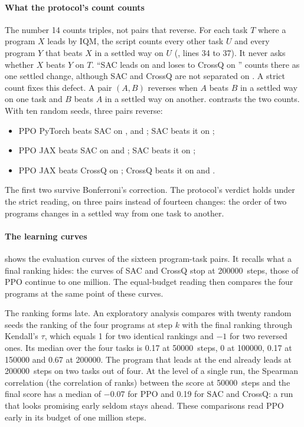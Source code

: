 \paragraph{What the protocol's count counts}
The number 14 counts triples, not pairs that reverse. For each task $T$ where a program $X$ leads by IQM,
the script counts every other task $U$ and every program $Y$ that beats $X$ in a settled way on $U$
(, lines 34 to 37). It never asks whether $X$ beats $Y$ on $T$. \enquote{SAC leads
on  and loses to CrossQ on } counts there as one settled change, although SAC
and CrossQ are not separated on . A strict count fixes this defect. A pair $(A, B)$ reverses when $A$ beats $B$ in a settled way on one task
and $B$ beats $A$ in a settled way on another.  contrasts the two counts. With ten
random seeds, three pairs reverse:
\begin{itemize}
  \item PPO PyTorch beats SAC on ,  and ; SAC beats it on
    ;
  \item PPO JAX beats SAC on  and ; SAC beats it on ;
  \item PPO JAX beats CrossQ on ; CrossQ beats it on  and .
\end{itemize}
The first two survive Bonferroni's correction. The protocol's verdict holds under the strict reading, on
three pairs instead of fourteen changes: the order of two programs changes in a settled way from one task to
another.


\paragraph{The learning curves}
 shows the evaluation curves of the sixteen program-task pairs. It recalls
what a final ranking hides: the curves of SAC and CrossQ stop at \num{200000}~steps, those of PPO continue to
one million. The equal-budget reading then compares the four programs at the same point of these curves.

The ranking forms late. An exploratory analysis
compares with twenty random seeds the ranking of the four programs at
step $k$ with the final ranking through Kendall's $\tau$, which equals 1 for two identical rankings and $-1$
for two reversed ones. Its median over the four tasks is 0.17 at \num{50000}~steps, 0 at \num{100000}, 0.17
at \num{150000} and 0.67 at \num{200000}. The program that leads at the end already leads at
\num{200000}~steps on two tasks out of four. At the level of a single run, the Spearman correlation (the correlation of
ranks) between the score at \num{50000}~steps and the final score has a median of $-0.07$ for PPO and 0.19 for SAC and
CrossQ: a run that looks promising early seldom stays ahead. These comparisons read PPO early in its budget of
one million steps.

